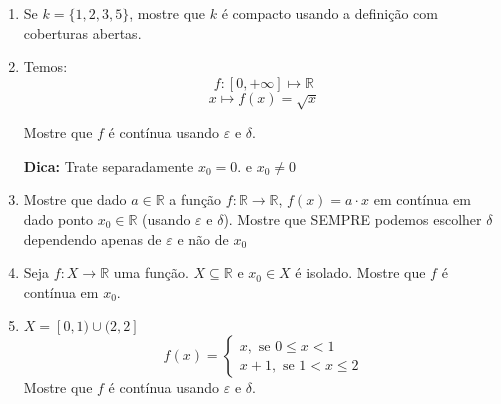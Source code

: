 \documentclass[12pt]{article}
\begin{document}
\begin{enumerate}
    \item Se $k=\{1,2,3,5\}$, mostre que  $k$ é compacto usando a definição com coberturas abertas.
    
    \item Temos: 
    \begin{equation*}
        f:\left[0, +\infty \right] \longmapsto \mathbb{R}
    \end{equation*}
    \begin{equation*}
        x \longmapsto f(x) = \sqrt{x}
    \end{equation*}

    Mostre que $f$ é contínua usando $\varepsilon$ e $\delta$.

    \textbf{Dica:} Trate separadamente $x_0 = 0$. e $x_0 \neq 0$

    \item Mostre que dado $a \in \mathbb{R}$ a função $f: \mathbb{R} \to \mathbb{R}$, $f(x) = a \cdot x$ em contínua em dado ponto $x_0 \in \mathbb{R}$ (usando $\varepsilon \text{ e } \delta$). Mostre que SEMPRE podemos escolher $\delta$ dependendo apenas de $\varepsilon$ e não de $x_0$

    \item Seja $f: X \to \mathbb{R}$ uma função. $X \subseteq \mathbb{R}$ e $x_0 \in X$ é isolado. Mostre que $f$ é contínua em $x_0$.

    \item  $X = [0,1) \cup (2,2]$
    \begin{equation*}
        f(x)=\left\{    
        \begin{array}{l}
            x, \text{ se } 0 \leq x < 1 \\
            x+1, \text{ se } 1 <x \leq 2
        \end{array}
        \right.
    \end{equation*}
    Mostre que $f$ é contínua usando $\varepsilon$ e $\delta$.
\end{enumerate}
\end{document}
